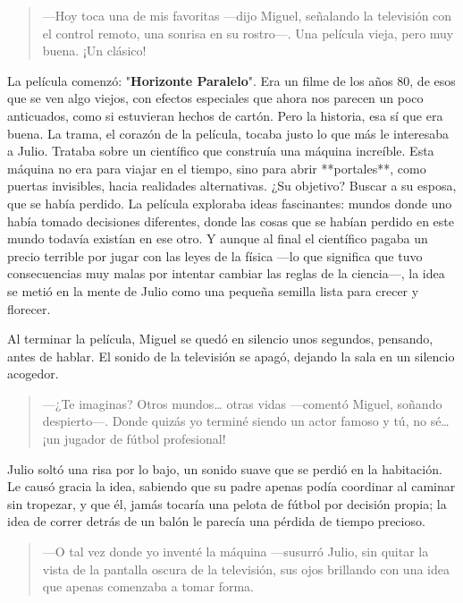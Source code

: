 \documentclass[a4paper,12pt]{book}
\begin{document}
\begin{quote}
    —Hoy toca una de mis favoritas —dijo Miguel, señalando la televisión con el control remoto, una sonrisa en su rostro—. Una película vieja, pero muy buena. ¡Un clásico!
\end{quote}

La película comenzó: "\textbf{Horizonte Paralelo}". Era un filme de los años 80, de esos que se ven algo viejos, con efectos especiales que ahora nos parecen un poco anticuados, como si estuvieran hechos de cartón. Pero la historia, esa sí que era buena. La trama, el corazón de la película, tocaba justo lo que más le interesaba a Julio. Trataba sobre un científico que construía una máquina increíble. Esta máquina no era para viajar en el tiempo, sino para abrir **portales**, como puertas invisibles, hacia realidades alternativas. ¿Su objetivo? Buscar a su esposa, que se había perdido. La película exploraba ideas fascinantes: mundos donde uno había tomado decisiones diferentes, donde las cosas que se habían perdido en este mundo todavía existían en ese otro. Y aunque al final el científico pagaba un precio terrible por jugar con las leyes de la física —lo que significa que tuvo consecuencias muy malas por intentar cambiar las reglas de la ciencia—, la idea se metió en la mente de Julio como una pequeña semilla lista para crecer y florecer.

Al terminar la película, Miguel se quedó en silencio unos segundos, pensando, antes de hablar. El sonido de la televisión se apagó, dejando la sala en un silencio acogedor.

\begin{quote}
    —¿Te imaginas? Otros mundos… otras vidas —comentó Miguel, soñando despierto—. Donde quizás yo terminé siendo un actor famoso y tú, no sé… ¡un jugador de fútbol profesional!
\end{quote}

Julio soltó una risa por lo bajo, un sonido suave que se perdió en la habitación. Le causó gracia la idea, sabiendo que su padre apenas podía coordinar al caminar sin tropezar, y que él, jamás tocaría una pelota de fútbol por decisión propia; la idea de correr detrás de un balón le parecía una pérdida de tiempo precioso.

\begin{quote}
    —O tal vez donde yo inventé la máquina —susurró Julio, sin quitar la vista de la pantalla oscura de la televisión, sus ojos brillando con una idea que apenas comenzaba a tomar forma.
\end{quote}
\end{document}
